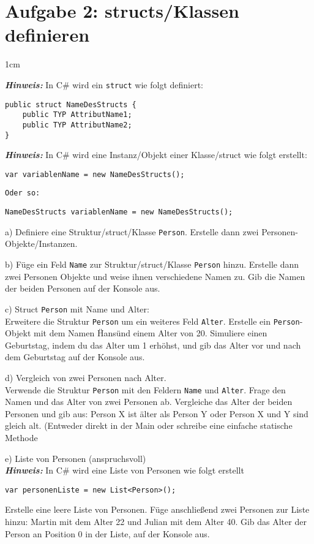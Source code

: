 \documentclass[12pt]{article}
\newenvironment{aufgabe}[2]
  {%
   \section*{Aufgabe #1: #2}
   \vspace{0.5em}
   \begin{adjustwidth}{1cm}{}  %
  }
  {%
   \end{adjustwidth}
  }
\newcommand{\subaufgabe}[1]{
    #1
}
\newcommand{\hint}[1]{
    \vspace{0.5em}
    \textbf{\textit{Hinweis:}} #1
    \vspace{0.5em}
}
\begin{document}
\begin{aufgabe}{2}{structs/Klassen definieren}
\hint{In C\# wird ein \texttt{struct} wie folgt definiert:}
\begin{lstlisting}
public struct NameDesStructs {
    public TYP AttributName1;
    public TYP AttributName2;
}
\end{lstlisting}
\newpage
\hint{In C\# wird eine Instanz/Objekt einer Klasse/struct wie folgt erstellt:}
\begin{lstlisting}
var variablenName = new NameDesStructs();
\end{lstlisting}
\texttt{Oder so:}
\begin{lstlisting}
NameDesStructs variablenName = new NameDesStructs();
\end{lstlisting}
\subaufgabe{a)
Definiere eine Struktur/struct/Klasse \texttt{Person}. Erstelle dann zwei Personen-Objekte/Instanzen.}

\subaufgabe{b) Füge ein Feld \texttt{Name} zur Struktur/struct/Klasse \texttt{Person} hinzu. Erstelle dann zwei Personen Objekte und weise ihnen verschiedene Namen zu. Gib die Namen der beiden Personen auf der Konsole aus.}

\subaufgabe{c) Struct \texttt{Person} mit Name und Alter: \\
Erweitere die Struktur \texttt{Person} um ein weiteres Feld \texttt{Alter}. Erstelle ein \texttt{Person}-Objekt mit dem Namen \"Hans\" und einem Alter von 20. Simuliere einen Geburtstag, indem du das Alter um 1 erhöhst, und gib das Alter vor und nach dem Geburtstag auf der Konsole aus.

}

\subaufgabe{d) Vergleich von zwei Personen nach Alter. \\
Verwende die Struktur \texttt{Person} mit den Feldern \texttt{Name} und \texttt{Alter}. Frage den Namen und das Alter von zwei Personen ab. Vergleiche das Alter der beiden Personen und gib aus: Person X ist älter als Person Y
 oder Person X und Y sind gleich alt. (Entweder direkt in der Main oder schreibe eine einfache statische Methode}


\subaufgabe{e) Liste von Personen (anspruchsvoll)\\}
\hint{ In C\# wird eine Liste von Personen wie folgt erstellt}
\begin{lstlisting}
var personenListe = new List<Person>();
\end{lstlisting}
Erstelle eine leere Liste von Personen. Füge anschließend zwei Personen zur Liste hinzu: Martin mit dem Alter 22 und Julian mit dem Alter 40. Gib das Alter der Person an Position 0 in der Liste, auf der Konsole aus.


\end{aufgabe}
\end{document}
